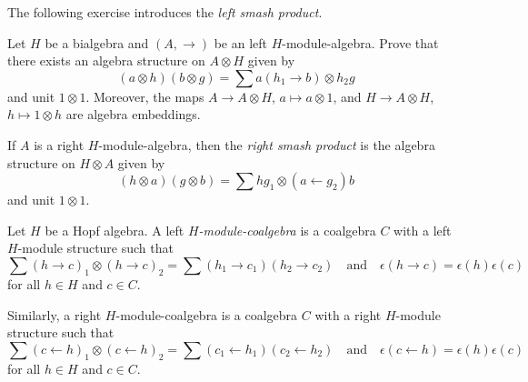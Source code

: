\documentclass[12pt]{amsproc}
\begin{document}

The following exercise introduces the 
\emph{left smash product}. 

\begin{exercise}
\label{xca:left_smash}
Let $H$ be a bialgebra and $(A,\rightarrow)$ be an left $H$-module-algebra.
Prove that there exists an algebra structure on $A\otimes H$ given by
\[
(a\otimes h)(b\otimes g)=\sum a(h_{1}\rightarrow b)\otimes h_{2}g
\]
and unit $1\otimes1$. Moreover, 
the maps $A\to A\otimes H$, $a\mapsto a\otimes1$,
and $H\to A\otimes H$, $h\mapsto 1\otimes h$ 
are algebra embeddings.
\end{exercise}

If $A$ is a right $H$-module-algebra, then 
the \emph{right smash product} is the algebra structure 
on $H\otimes A$ given by 
\[
(h\otimes a)(g\otimes b)=\sum hg_{1}\otimes(a\leftarrow g_{2})b
\]
and unit $1\otimes1$.



\begin{definition}
\label{def:module_coalgebra}
Let $H$ be a Hopf algebra. A left \emph{$H$-module-coalgebra}
is a coalgebra $C$ with a left $H$-module structure such that 
\[
\sum (h\rightarrow c)_{1}\otimes(h\rightarrow c)_{2} =\sum (h_{1}\rightarrow c_{1})(h_{2}\rightarrow c_{2})
\quad\text{and}\quad 
\epsilon(h\rightarrow c)  =\epsilon(h)\epsilon(c)
\]
for all $h\in H$ and $c\in C$. 
\end{definition}

Similarly, a right $H$-module-coalgebra 
is a coalgebra $C$ with a right
$H$-module structure such that 
\[
\sum (c\leftarrow h)_{1}\otimes(c\leftarrow h)_{2} =\sum (c_{1}\leftarrow h_{1})(c_{2}\leftarrow h_{2})
\quad\text{and}\quad 
\epsilon(c\leftarrow h)  =\epsilon(h)\epsilon(c)
\]
for all $h\in H$ and $c\in C$.
\end{document}
